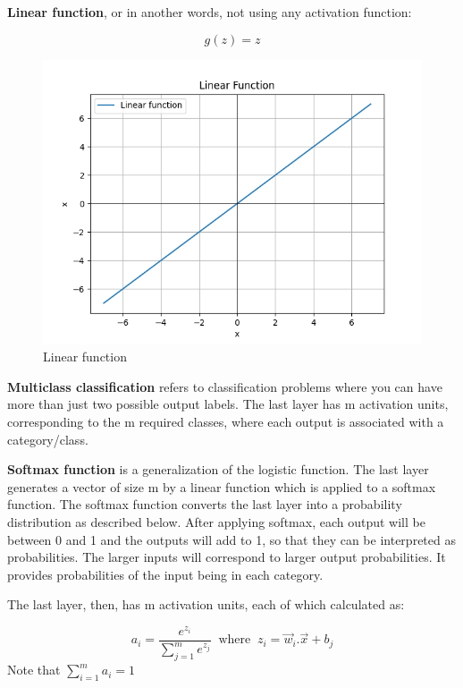 \documentclass[12pt]{report}
\begin{document}
\textbf{Linear function}, or in another words, not using any activation function:

\begin{equation}
  g(z) = z
\end{equation}

\begin{figure}[H]
  \centering
  \includegraphics[trim =0.0cm 0.0cm 0.0cm 0.0cm, clip, scale=0.5]{pics/Linear.png}
  \caption{Linear function}
\end{figure}

\textbf{Multiclass classification} refers to classification problems where you can have more than just two possible output labels. The last layer has m activation units, corresponding to the m required classes, where each output is associated with a category/class.

\textbf{Softmax function} is a generalization of the logistic function. The last layer generates a vector of size m by a linear function which is applied to a softmax function. The softmax function converts the last layer into a probability distribution as described below. After applying softmax, each output will be between 0 and 1 and the outputs will add to 1, so that they can be interpreted as probabilities. The larger inputs will correspond to larger output probabilities. It provides probabilities of the input being in each category.


The last layer, then, has m activation units, each of which calculated as:

\begin{equation}
  a_i = \frac{e^{z_i}}{ \sum_{j=1}^{m} e^{z_j} } \;\; \text{where} \;\; z_i= \overrightarrow{w}_i. \overrightarrow{x}+b_j
\end{equation}
Note that $\sum_{i = 1}^{m}  a_i = 1$
\end{document}
